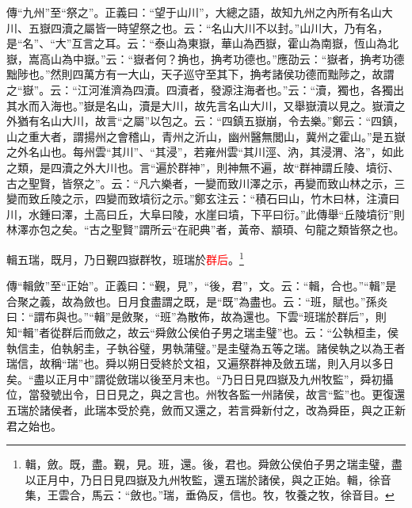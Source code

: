 {\noindent\zhuan{}\fzbyks 傳“九州”至“祭之”。正義曰：“望于山川”，大總之語，故知九州之內所有名山大川、五嶽四瀆之屬皆一時望祭之也。云：“名山大川不以封。”山川大，乃有名，是“名”、“大”互言之耳。云：“泰山為東嶽，華山為西嶽，霍山為南嶽，恆山為北嶽，嵩高山為中嶽。”云：“嶽者何？捔也，捔考功德也。”應劭云：“嶽者，捔考功德黜陟也。”然則四萬方有一大山，天子巡守至其下，捔考諸侯功德而黜陟之，故謂之“嶽”。云：“江河淮濟為四瀆。四瀆者，發源注海者也。”云：“瀆，獨也，各獨出其水而入海也。”嶽是名山，瀆是大川，故先言名山大川，又舉嶽瀆以見之。嶽瀆之外猶有名山大川，故言“之屬”以包之。云：“四鎮五嶽崩，令去樂。”鄭云：“四鎮，山之重大者，謂揚州之會稽山，青州之沂山，幽州醫無閭山，冀州之霍山。”是五嶽之外名山也。每州雲“其川”、“其浸”，若雍州雲“其川涇、汭，其浸渭、洛”，如此之類，是四瀆之外大川也。言“遍於群神”，則神無不遍，故“群神謂丘陵、墳衍、古之聖賢，皆祭之”。云：“凡六樂者，一變而致川澤之示，再變而致山林之示，三變而致丘陵之示，四變而致墳衍之示。”鄭玄注云：“積石曰山，竹木曰林，注瀆曰川，水鍾曰澤，土高曰丘，大阜曰陵，水崖曰墳，下平曰衍。”此傳舉“丘陵墳衍”則林澤亦包之矣。“古之聖賢”謂所云“在祀典”者，黃帝、顓頊、句龍之類皆祭之也。 \par}

輯五瑞，既月，乃日覲四嶽群牧，班瑞於\textcolor{red}{群后}。\footnote{輯，斂。既，盡。覲，見。班，還。後，君也。舜斂公侯伯子男之瑞圭璧，盡以正月中，乃日日見四嶽及九州牧監，還五瑞於諸侯，與之正始。輯，徐音集，王雲合，馬云：“斂也。”瑞，垂偽反，信也。牧，牧養之牧，徐音目。}

{\noindent\zhuan{}\fzbyks 傳“輯斂”至“正始”。正義曰：“覲，見”，“後，君”，文。云：“輯，合也。”“輯”是合聚之義，故為斂也。日月食盡謂之既，是“既”為盡也。云：“班，賦也。”孫炎曰：“謂布與也。”“輯”是斂聚，“班”為散佈，故為還也。下雲“班瑞於群后”，則知“輯”者從群后而斂之，故云“舜斂公侯伯子男之瑞圭璧”也。云：“公執桓圭，侯執信圭，伯執躬圭，子執谷璧，男執蒲璧。”是圭璧為五等之瑞。諸侯執之以為王者瑞信，故稱“瑞”也。舜以朔日受終於文祖，又遍祭群神及斂五瑞，則入月以多日矣。“盡以正月中”謂從斂瑞以後至月末也。“乃日日見四嶽及九州牧監”，舜初攝位，當發號出令，日日見之，與之言也。州牧各監一州諸侯，故言“監”也。更復還五瑞於諸侯者，此瑞本受於堯，斂而又還之，若言舜新付之，改為舜臣，與之正新君之始也。 \par}

